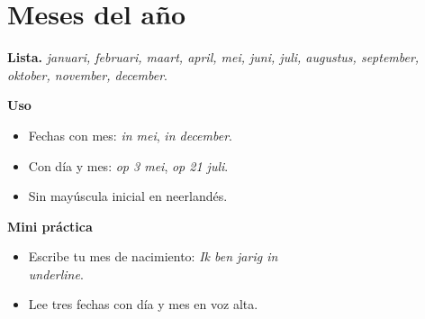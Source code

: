 \section{Meses del año}
\textbf{Lista.} \textit{januari, februari, maart, april, mei, juni, juli, augustus, september, oktober, november, december}.

\textbf{Uso}
\begin{itemize}[leftmargin=*]
  \item Fechas con mes: \textit{in mei}, \textit{in december}.
  \item Con día y mes: \textit{op 3 mei}, \textit{op 21 juli}.
  \item Sin mayúscula inicial en neerlandés.
\end{itemize}

\textbf{Mini práctica}
\begin{itemize}[leftmargin=*]
  \item Escribe tu mes de nacimiento: \textit{Ik ben jarig in \\underline{\hspace{1.2cm}}}.
  \item Lee tres fechas con día y mes en voz alta.
\end{itemize}
